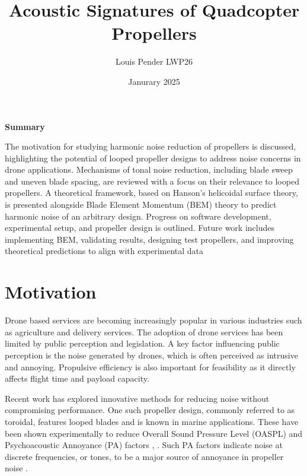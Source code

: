 \documentclass{article}
\begin{document}
\immediate{}

\title{Acoustic Signatures of Quadcopter Propellers}
\author{Louis Pender LWP26}
\date{Janurary 2025}
\maketitle 

\begin{center}
    \textbf{Summary}

    The motivation for studying harmonic noise reduction of propellers is discussed, highlighting the potential of looped propeller designs to address noise concerns in drone applications.
    Mechanisms of tonal noise reduction, including blade sweep and uneven blade spacing, are reviewed with a focus on their relevance to looped propellers.
    A theoretical framework, based on Hanson's helicoidal surface theory, is presented alongside Blade Element Momentum (BEM) theory to predict harmonic noise of an arbitrary design.
    Progress on software development, experimental setup, and propeller design is outlined.
    Future work includes implementing BEM, validating results, designing test propellers, and improving theoretical predictions to align with experimental data
\end{center}

\section{Motivation}
Drone based services are becoming increasingly popular in various industries such as agriculture and delivery services.
The adoption of drone services has been limited by public perception and legislation.
A key factor influencing public perception is the noise generated by drones, which is often perceived as intrusive and annoying.
Propulsive efficiency is also important for feasibility as it directly affects flight time and payload capacity.

Recent work has explored innovative methods for reducing noise without compromising performance.
One such propeller design, commonly referred to as toroidal, features looped blades and is known in marine applications.
These have been shown experimentally to reduce Overall Sound Pressure Level (OASPL) and Psychoacoustic Annoyance (PA) factors \cite{shima_toroidal}, \cite{ijerph20031955}.
Such PA factors indicate noise at discrete frequencies, or tones, to be a major source of annoyance in propeller noise \cite{ijerph20031955}. %
\end{document}
